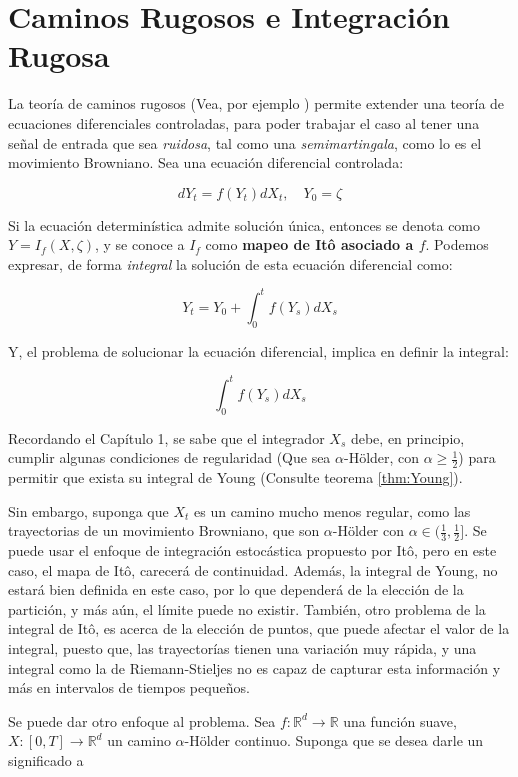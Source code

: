 \chapter{Caminos Rugosos e Integración Rugosa}

La teoría de caminos rugosos (Vea, por ejemplo \cite{Rough_Paths_TL})  permite extender una teoría de ecuaciones diferenciales controladas, para poder trabajar el caso al tener una señal de entrada que sea \textit{ruidosa}, tal como una \textit{semimartingala}, como lo es el movimiento Browniano. Sea una ecuación diferencial controlada:

\[
	d Y_t = f(Y_t) dX_t, \quad Y_0 = \zeta
\]

Si la ecuación determinística admite solución única, entonces se denota como $Y = I_f(X, \zeta)$, y se conoce a $I_f$ como \textbf{mapeo de Itô asociado a $f$}. Podemos expresar, de forma \textit{integral} la solución de esta ecuación diferencial como:

\[
	Y_t = Y_0 + \int_{0}^t f(Y_s) dX_s
\]

Y, el problema de solucionar la ecuación diferencial, implica en definir la integral:

\[
	\int_{0}^t f(Y_s) dX_s	
\]

Recordando el Capítulo 1, se sabe que el integrador $X_s$ debe, en principio, cumplir algunas condiciones de regularidad (Que sea $\alpha$-Hölder, con $\alpha \geq \frac{1}{2}$) para permitir que exista su integral de Young (Consulte teorema \ref{thm:Young}).

Sin embargo, suponga que $X_t$ es un camino mucho menos regular, como las trayectorias de un movimiento Browniano, que son $\alpha$-Hölder con $\alpha \in ( \frac{1}{3}, \frac{1}{2} ]$. Se puede usar el enfoque de integración estocástica propuesto por Itô, pero en este caso, el mapa de Itô, carecerá de continuidad. Además, la integral de Young, no estará bien definida en este caso, por lo que dependerá de la elección de la partición, y más aún, el límite puede no existir. También, otro problema de la integral de Itô, es acerca de la elección de puntos, que puede afectar el valor de la integral, puesto que, las trayectorías tienen una variación muy rápida, y una integral como la de Riemann-Stieljes no es capaz de capturar esta información y más en intervalos de tiempos pequeños.

Se puede dar otro enfoque al problema. Sea $f: \mathbb{R}^d \rightarrow \mathbb{R}$ una función suave, $X: [0,T]\rightarrow \mathbb{R}^d$ un camino $\alpha$-Hölder continuo. Suponga que se desea darle un significado a

